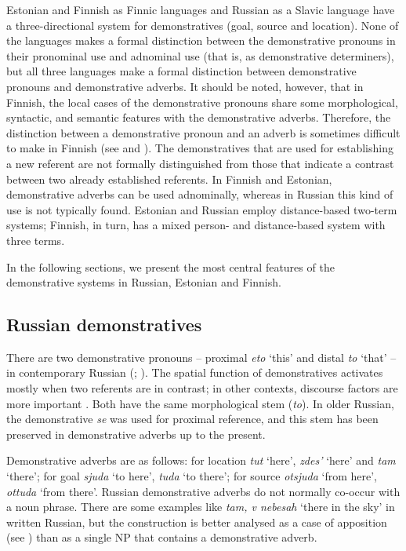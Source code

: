 \documentclass[output=paper,colorlinks,citecolor=brown]{langscibook}
\begin{document}
Estonian and Finnish as Finnic languages and Russian as a Slavic language have a three-directional system for demonstratives (goal, source and location). None of the languages makes a formal distinction between the demonstrative pronouns in their pronominal use and adnominal use (that is, as demonstrative determiners), but all three languages make a formal distinction between demonstrative pronouns and demonstrative adverbs. It should be noted, however, that in Finnish, the local cases of the demonstrative pronouns share some morphological, syntactic, and semantic features with the demonstrative adverbs. Therefore, the distinction between a demonstrative pronoun and an adverb is sometimes difficult to make in Finnish (see  and \citealt{Laury1996}). The demonstratives that are used for establishing a new referent are not formally distinguished from those that indicate a contrast between two already established referents. In Finnish and Estonian, demonstrative adverbs can be used adnominally, whereas in Russian this kind of use is not typically found. Estonian and Russian employ distance-based two-term systems; Finnish, in turn, has a mixed person- and distance-based system with three terms.

In the following sections, we present the most central features of the demonstrative systems in Russian, Estonian and Finnish.

\subsection{Russian demonstratives}\label{sec:nahkola:3.1}

There are two demonstrative pronouns – proximal \textit{eto} ‘this’ and distal \textit{to} ‘that’ – in contemporary Russian (\citealt[118]{Sheljakin2002}; \citealt[233]{Timberlake2004}). The spatial function of demonstratives activates mostly when two referents are in contrast; in other contexts, discourse factors are more important \citep{Grenoble1998}. Both have the same morphological stem (\textit{to}). In older Russian, the demonstrative \textit{se} was used for proximal reference, and this stem has been preserved in demonstrative adverbs up to the present.

Demonstrative adverbs are as follows: for location \textit{tut} ‘here’, \textit{zdes’} ‘here’ and \textit{tam} ‘there’; for goal \textit{sjuda} ‘to here’, \textit{tuda} ‘to there’; for source \textit{otsjuda} ‘from here’, \textit{ottuda} ‘from there’. Russian demonstrative adverbs do not normally co-occur with a noun phrase. There are some examples like \textit{tam, v nebesah} ‘there in the sky’ in written Russian, but the construction is better analysed as a case of apposition (see \citealt{Sahkai2003}) than as a single NP that contains a demonstrative adverb.
\end{document}
